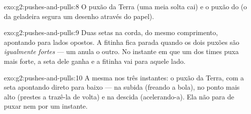 \begin{solution}{exo:g2:pushes-and-pulls:8}
O puxão da Terra (uma meia solta cai) e o puxão do  (o  da
geladeira segura um desenho através do papel).
\end{solution}

\begin{solution}{exo:g2:pushes-and-pulls:9}
Duas setas na corda, do mesmo comprimento, apontando para lados
opostos. A fitinha fica parada quando os dois puxões são
\emph{igualmente fortes} --- um anula o outro. No instante em que um
dos times puxa mais forte, a seta dele ganha e a fitinha vai para
aquele lado.
\end{solution}

\begin{solution}{exo:g2:pushes-and-pulls:10}
A mesma  nos três instantes: o puxão da Terra, com a seta
apontando direto para baixo --- na subida (freando a bola), no ponto
mais alto (prestes a trazê-la de volta) e na descida (acelerando-a).
Ela não para de puxar nem por um instante.
\end{solution}
